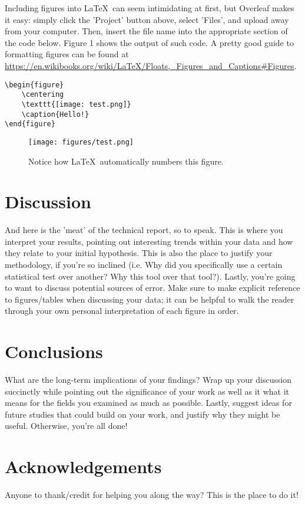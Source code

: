 \documentclass[10pt,twocolumn,letterpaper]{article}
\begin{document}
Including figures into \LaTeX\ can seem intimidating at first, but Overleaf makes it easy: simply click the 'Project' button above, select 'Files', and upload away from your computer. Then, insert the file name into the appropriate section of the code below.  Figure 1  shows the output of such code. A pretty good guide to formatting figures can be found at \url{https://en.wikibooks.org/wiki/LaTeX/Floats,_Figures_and_Captions#Figures}.
\\

{\scriptsize
\begin{verbatim}
\begin{figure}
    \centering
    \texttt{[image: test.png]}
    \caption{Hello!}
\end{figure}
\end{verbatim}
}

\begin{figure}
  \centering
  \texttt{[image: figures/test.png]}
  \caption{Notice how \LaTeX\ automatically numbers this figure.}
\end{figure}


\section{Discussion}
And here is the 'meat' of the technical report, so to speak. This is where you interpret your results, pointing out interesting trends within your data and how they relate to your initial hypothesis. This is also the place to justify your methodology, if you're so inclined (i.e. Why did you specifically use a certain statistical test over another? Why this tool over that tool?). Lastly, you're going to want to discuss potential sources of error. Make sure to make explicit reference to figures/tables when discussing your data; it can be helpful to walk the reader through your own personal interpretation of each figure in order.

\section*{Conclusions}
What are the long-term implications of your findings? Wrap up your discussion succinctly while pointing out the significance of your work as well as it what it means for the fields you examined as much as possible. Lastly, suggest ideas for future studies that could build on your work, and justify why they might be useful. Otherwise, you're all done!

\section*{Acknowledgements}
Anyone to thank/credit for helping you along the way? This is the place to do it!
\end{document}
